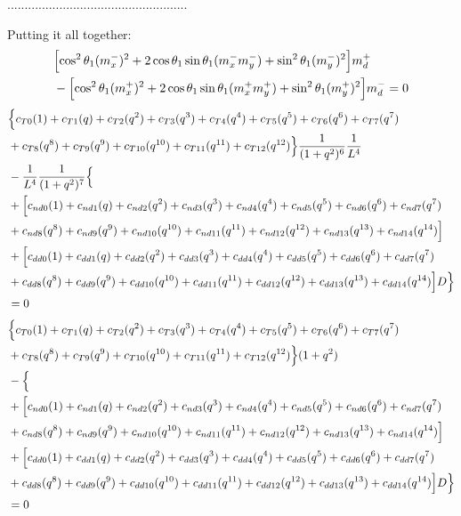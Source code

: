 \documentclass[12pt]{article}
\begin{document}
....................................................

Putting it all together:
\begin{align}
    &\Bigl[\cos^2\theta_1(m_x^-)^2 + 2\cos\theta_1\sin\theta_1 (m_x^-m_y^-)  + \sin^2\theta_1(m_y^-)^2 \Bigr] m_d^+ \nonumber\\
    &- \Bigl[ \cos^2\theta_1(m_x^+)^2  + 2\cos\theta_1\sin\theta_1(m_x^+m_y^+)  +\sin^2\theta_1(m_y^+)^2 \Bigr] m_d^- = 0
\end{align}
\begin{align}
    & \Bigl\{ c_{T0}(1) + c_{T1}(q) + c_{T2}(q^2) + c_{T3}(q^3) + c_{T4}(q^4) + c_{T5}(q^5) + c_{T6}(q^6) + c_{T7}(q^7)\nonumber\\
    &+ c_{T8}(q^8) + c_{T9}(q^9) + c_{T10}(q^{10}) + c_{T11}(q^{11}) + c_{T12}(q^{12}) \Bigr\}\frac{1}{(1+q^2)^6}\frac{1}{L^4} \nonumber\\
    &- \frac{1}{L^4} \frac{1}{(1+q^2)^7} \Bigl\{ \nonumber\\
    &+ \Bigl[ c_{nd0}(1) + c_{nd1}(q) + c_{nd2}(q^2) + c_{nd3}(q^3) + c_{nd4}(q^4) + c_{nd5}(q^5) + c_{nd6}(q^6) + c_{nd7}(q^7) \nonumber\\
    &+ c_{nd8}(q^8) + c_{nd9}(q^9) + c_{nd10}(q^{10}) + c_{nd11}(q^{11}) + c_{nd12}(q^{12}) + c_{nd13}(q^{13}) + c_{nd14}(q^{14}) \Bigr] \nonumber\\
    &+ \Bigl[  c_{dd0}(1) + c_{dd1}(q) + c_{dd2}(q^2) + c_{dd3}(q^3) + c_{dd4}(q^4) + c_{dd5}(q^5) + c_{dd6}(q^6) + c_{dd7}(q^7) \nonumber\\
    &+ c_{dd8}(q^8) + c_{dd9}(q^9) + c_{dd10}(q^{10}) + c_{dd11}(q^{11}) + c_{dd12}(q^{12}) + c_{dd13}(q^{13}) + c_{dd14}(q^{14}) \Bigr]D  \Bigr\} \nonumber\\
    &= 0
\end{align}
\begin{align}
    & \Bigl\{ c_{T0}(1) + c_{T1}(q) + c_{T2}(q^2) + c_{T3}(q^3) + c_{T4}(q^4) + c_{T5}(q^5) + c_{T6}(q^6) + c_{T7}(q^7)\nonumber\\
    &+ c_{T8}(q^8) + c_{T9}(q^9) + c_{T10}(q^{10}) + c_{T11}(q^{11}) + c_{T12}(q^{12}) \Bigr\} (1+q^2) \nonumber\\
    &- \Bigl\{ \nonumber\\
    &+ \Bigl[ c_{nd0}(1) + c_{nd1}(q) + c_{nd2}(q^2) + c_{nd3}(q^3) + c_{nd4}(q^4) + c_{nd5}(q^5) + c_{nd6}(q^6) + c_{nd7}(q^7) \nonumber\\
    &+ c_{nd8}(q^8) + c_{nd9}(q^9) + c_{nd10}(q^{10}) + c_{nd11}(q^{11}) + c_{nd12}(q^{12}) + c_{nd13}(q^{13}) + c_{nd14}(q^{14}) \Bigr] \nonumber\\
    &+ \Bigl[  c_{dd0}(1) + c_{dd1}(q) + c_{dd2}(q^2) + c_{dd3}(q^3) + c_{dd4}(q^4) + c_{dd5}(q^5) + c_{dd6}(q^6) + c_{dd7}(q^7) \nonumber\\
    &+ c_{dd8}(q^8) + c_{dd9}(q^9) + c_{dd10}(q^{10}) + c_{dd11}(q^{11}) + c_{dd12}(q^{12}) + c_{dd13}(q^{13}) + c_{dd14}(q^{14}) \Bigr]D  \Bigr\} \nonumber\\
    &= 0
\end{align}
\end{document}
